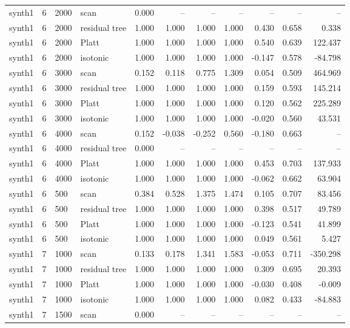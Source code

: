 \begin{tabular}{lrllrrrrrrr}
synth1 & 6 & 2000 & scan & 0.000 & -- & -- & -- & -- & -- & -- \\
synth1 & 6 & 2000 & residual tree & 1.000 & 1.000 & 1.000 & 1.000 & 0.430 & 0.658 & 0.338 \\
synth1 & 6 & 2000 & Platt & 1.000 & 1.000 & 1.000 & 1.000 & 0.540 & 0.639 & 122.437 \\
synth1 & 6 & 2000 & isotonic & 1.000 & 1.000 & 1.000 & 1.000 & -0.147 & 0.578 & -84.798 \\
synth1 & 6 & 3000 & scan & 0.152 & 0.118 & 0.775 & 1.309 & 0.054 & 0.509 & 464.969 \\
synth1 & 6 & 3000 & residual tree & 1.000 & 1.000 & 1.000 & 1.000 & 0.159 & 0.593 & 145.214 \\
synth1 & 6 & 3000 & Platt & 1.000 & 1.000 & 1.000 & 1.000 & 0.120 & 0.562 & 225.289 \\
synth1 & 6 & 3000 & isotonic & 1.000 & 1.000 & 1.000 & 1.000 & -0.020 & 0.560 & 43.531 \\
synth1 & 6 & 4000 & scan & 0.152 & -0.038 & -0.252 & 0.560 & -0.180 & 0.663 & -- \\
synth1 & 6 & 4000 & residual tree & 0.000 & -- & -- & -- & -- & -- & -- \\
synth1 & 6 & 4000 & Platt & 1.000 & 1.000 & 1.000 & 1.000 & 0.453 & 0.703 & 137.933 \\
synth1 & 6 & 4000 & isotonic & 1.000 & 1.000 & 1.000 & 1.000 & -0.062 & 0.662 & 63.904 \\
synth1 & 6 & 500 & scan & 0.384 & 0.528 & 1.375 & 1.474 & 0.105 & 0.707 & 83.456 \\
synth1 & 6 & 500 & residual tree & 1.000 & 1.000 & 1.000 & 1.000 & 0.398 & 0.517 & 49.789 \\
synth1 & 6 & 500 & Platt & 1.000 & 1.000 & 1.000 & 1.000 & -0.123 & 0.541 & 41.899 \\
synth1 & 6 & 500 & isotonic & 1.000 & 1.000 & 1.000 & 1.000 & 0.049 & 0.561 & 5.427 \\
synth1 & 7 & 1000 & scan & 0.133 & 0.178 & 1.341 & 1.583 & -0.053 & 0.711 & -350.298 \\
synth1 & 7 & 1000 & residual tree & 1.000 & 1.000 & 1.000 & 1.000 & 0.309 & 0.695 & 20.393 \\
synth1 & 7 & 1000 & Platt & 1.000 & 1.000 & 1.000 & 1.000 & -0.030 & 0.408 & -0.009 \\
synth1 & 7 & 1000 & isotonic & 1.000 & 1.000 & 1.000 & 1.000 & 0.082 & 0.433 & -84.883 \\
synth1 & 7 & 1500 & scan & 0.000 & -- & -- & -- & -- & -- & -- \\

\end{tabular}

